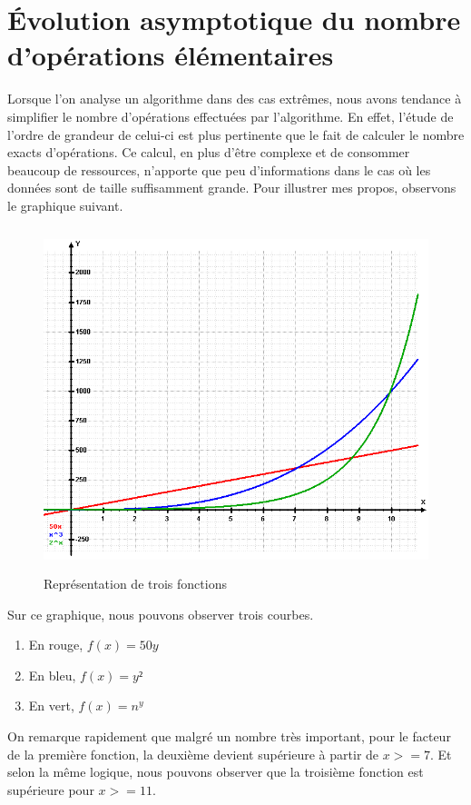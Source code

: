 \documentclass[12pt, twoside, openright]{report}
\begin{document}
\section{Évolution asymptotique du nombre d'opérations élémentaires}

Lorsque l'on analyse un algorithme dans des cas extrêmes, nous avons tendance à simplifier le nombre d'opérations effectuées par l'algorithme. En effet, l'étude de l'ordre de grandeur de celui-ci est plus pertinente que le fait de calculer le nombre exacts d'opérations. Ce calcul, en plus d'être complexe et de consommer beaucoup de ressources, n'apporte que peu d'informations dans le cas où les données sont de taille suffisamment grande. Pour illustrer mes propos, observons le graphique suivant.

\begin{figure}[H]
    \centering
    \includegraphics[height=10cm,width=14cm]{Complexite/Exponential.png}
    \caption{Représentation de trois fonctions}
    \label{fig:my_label}
\end{figure}

Sur ce graphique, nous pouvons observer trois courbes.

\begin{enumerate}
    \item En rouge, $f(x)=50y$
    \item En bleu, $f(x)=y²$
    \item En vert, $f(x)=n^{y}$
\end{enumerate}

On remarque rapidement que malgré un nombre très important, pour le facteur de la première fonction, la deuxième devient supérieure à partir de $x>=7$. Et selon la même logique, nous pouvons observer que la troisième fonction est supérieure pour $x>=11$. 
\end{document}
